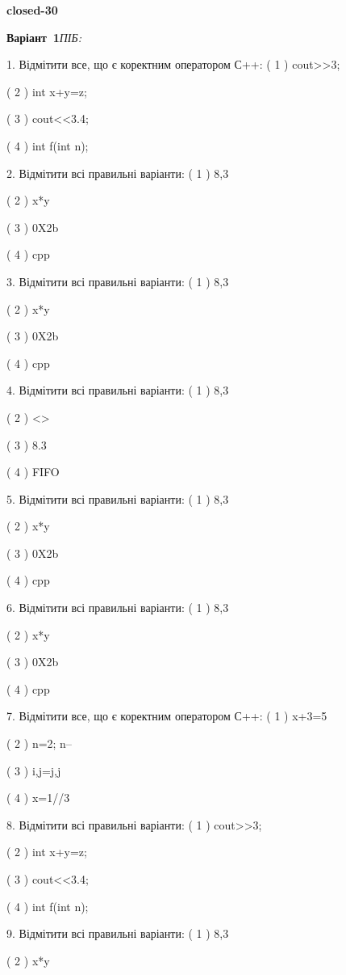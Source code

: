 \documentclass[11pt]{article}
\begin{document}
{\large\textbf{closed-30}}

\textbf{Варіант \No\,1}\hfill \textit{ПІБ:}\,\underline{\hspace{60mm}}
\vspace{4mm}

1. Відмітити все, що є коректним оператором С++:
( 1 ) cout>>3;

( 2 ) int x+y=z;

( 3 ) cout<<3.4;

( 4 ) int f(int n);

2. Відмітити всі правильні варіанти:
( 1 ) 8,3

( 2 ) x*y

( 3 ) 0X2b

( 4 ) cpp

3. Відмітити всі правильні варіанти:
( 1 ) 8,3

( 2 ) x*y

( 3 ) 0X2b

( 4 ) cpp

4. Відмітити всі правильні варіанти:
( 1 ) 8,3

( 2 ) <>

( 3 ) 8.3

( 4 ) FIFO

5. Відмітити всі правильні варіанти:
( 1 ) 8,3

( 2 ) x*y

( 3 ) 0X2b

( 4 ) cpp

6. Відмітити всі правильні варіанти:
( 1 ) 8,3

( 2 ) x*y

( 3 ) 0X2b

( 4 ) cpp

7. Відмітити все, що є коректним оператором С++:
( 1 ) x+3=5

( 2 ) n=2; n--

( 3 ) i,j=j,j

( 4 ) x=1//3

8. Відмітити всі правильні варіанти:
( 1 ) cout>>3;

( 2 ) int x+y=z;

( 3 ) cout<<3.4;

( 4 ) int f(int n);

9. Відмітити всі правильні варіанти:
( 1 ) 8,3

( 2 ) x*y
\end{document}

